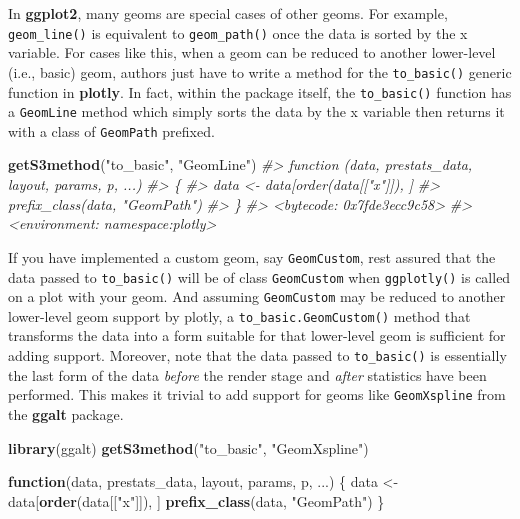 \documentclass[
  12pt,
]{krantz}
\newenvironment{Shaded}{\begin{snugshade}}{\end{snugshade}}
\newcommand{\CommentTok}[1]{\textcolor[rgb]{0.56,0.35,0.01}{\textit{#1}}}
\newcommand{\ControlFlowTok}[1]{\textcolor[rgb]{0.13,0.29,0.53}{\textbf{#1}}}
\newcommand{\KeywordTok}[1]{\textcolor[rgb]{0.13,0.29,0.53}{\textbf{#1}}}
\newcommand{\NormalTok}[1]{#1}
\newcommand{\StringTok}[1]{\textcolor[rgb]{0.31,0.60,0.02}{#1}}
\begin{document}
In \textbf{ggplot2}, many geoms are special cases of other geoms. For example, \texttt{geom\_line()} is equivalent to \texttt{geom\_path()} once the data is sorted by the x variable. For cases like this, when a geom can be reduced to another lower-level (i.e., basic) geom, authors just have to write a method for the \texttt{to\_basic()} generic function in \textbf{plotly}. In fact, within the package itself, the \texttt{to\_basic()} function has a \texttt{GeomLine} method which simply sorts the data by the x variable then returns it with a class of \texttt{GeomPath} prefixed.

\begin{Shaded}
\begin{Highlighting}[]
\KeywordTok{getS3method}\NormalTok{(}\StringTok{"to_basic"}\NormalTok{, }\StringTok{"GeomLine"}\NormalTok{)}
\CommentTok{#> function (data, prestats_data, layout, params, p, ...) }
\CommentTok{#> \{}
\CommentTok{#>     data <- data[order(data[["x"]]), ]}
\CommentTok{#>     prefix_class(data, "GeomPath")}
\CommentTok{#> \}}
\CommentTok{#> <bytecode: 0x7fde3ecc9c58>}
\CommentTok{#> <environment: namespace:plotly>}
\end{Highlighting}
\end{Shaded}

If you have implemented a custom geom, say \texttt{GeomCustom}, rest assured that the data passed to \texttt{to\_basic()} will be of class \texttt{GeomCustom} when \texttt{ggplotly()} is called on a plot with your geom. And assuming \texttt{GeomCustom} may be reduced to another lower-level geom support by plotly, a \texttt{to\_basic.GeomCustom()} method that transforms the data into a form suitable for that lower-level geom is sufficient for adding support. Moreover, note that the data passed to \texttt{to\_basic()} is essentially the last form of the data \emph{before} the render stage and \emph{after} statistics have been performed. This makes it trivial to add support for geoms like \texttt{GeomXspline} from the \textbf{ggalt} package.

\begin{Shaded}
\begin{Highlighting}[]
\KeywordTok{library}\NormalTok{(ggalt)}
\KeywordTok{getS3method}\NormalTok{(}\StringTok{"to_basic"}\NormalTok{, }\StringTok{"GeomXspline"}\NormalTok{)}
\end{Highlighting}
\end{Shaded}

\begin{Shaded}
\begin{Highlighting}[]
\ControlFlowTok{function}\NormalTok{(data, prestats_data, layout, params, p, ...) \{}
\NormalTok{  data <-}\StringTok{ }\NormalTok{data[}\KeywordTok{order}\NormalTok{(data[[}\StringTok{"x"}\NormalTok{]]), ]}
  \KeywordTok{prefix_class}\NormalTok{(data, }\StringTok{"GeomPath"}\NormalTok{)}
\NormalTok{\}}
\end{Highlighting}
\end{Shaded}
\end{document}
